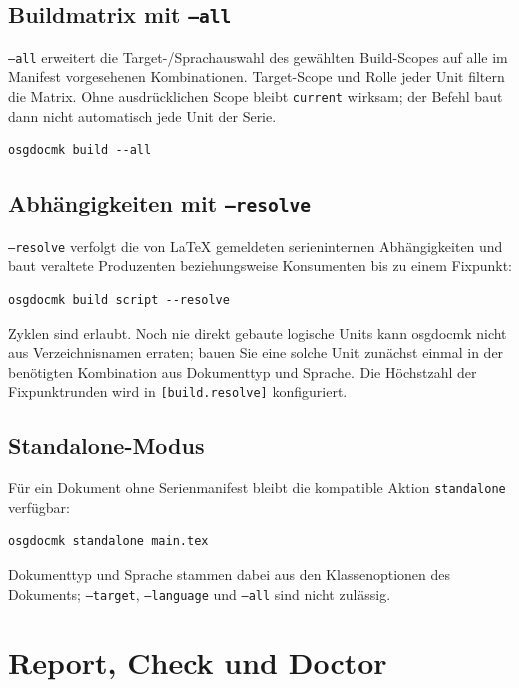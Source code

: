 \documentclass[
load-preamble+
]{osgdoc}
\begin{document}
\subsection{Buildmatrix mit \texttt{--all}}

\texttt{--all} erweitert die Target-/Sprachauswahl des gewählten Build-Scopes
auf alle im Manifest vorgesehenen Kombinationen. Target-Scope und Rolle jeder
Unit filtern die Matrix. Ohne ausdrücklichen Scope bleibt \texttt{current}
wirksam; der Befehl baut dann nicht automatisch jede Unit der Serie.

\begin{verbatim}
osgdocmk build --all
\end{verbatim}

\subsection{Abhängigkeiten mit \texttt{--resolve}}

\texttt{--resolve} verfolgt die von LaTeX gemeldeten serieninternen
Abhängigkeiten und baut veraltete Produzenten beziehungsweise Konsumenten bis
zu einem Fixpunkt:

\begin{verbatim}
osgdocmk build script --resolve
\end{verbatim}

Zyklen sind erlaubt. Noch nie direkt gebaute logische Units kann osgdocmk nicht
aus Verzeichnisnamen erraten; bauen Sie eine solche Unit zunächst einmal in
der benötigten Kombination aus Dokumenttyp und Sprache. Die Höchstzahl der Fixpunktrunden wird in
\verb|[build.resolve]| konfiguriert.

\subsection{Standalone-Modus}

Für ein Dokument ohne Serienmanifest bleibt die kompatible Aktion
\texttt{standalone} verfügbar:

\begin{verbatim}
osgdocmk standalone main.tex
\end{verbatim}

Dokumenttyp und Sprache stammen dabei aus den Klassenoptionen des Dokuments;
\texttt{--target}, \texttt{--language} und \texttt{--all} sind nicht
zulässig.

\section{Report, Check und Doctor}
\end{document}
